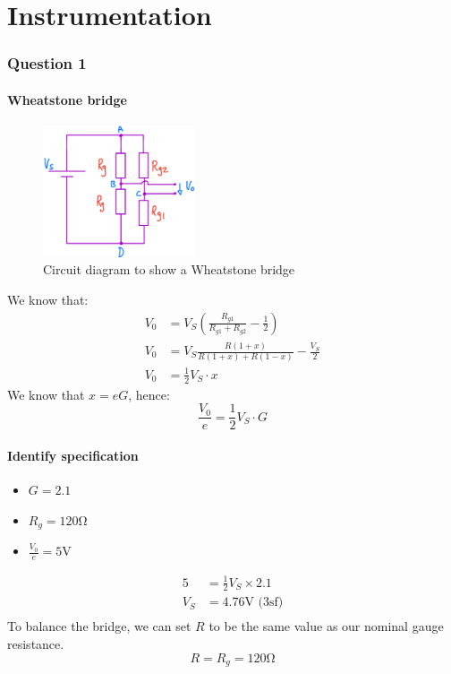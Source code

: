 \documentclass[12pt]{article}
\numberwithin{equation}{section}
\begin{document}
\part{Instrumentation}
\section{Question 1}
\subsection*{Wheatstone bridge}
\begin{figure}[H]
  \centering
  \includegraphics[width=0.4\textwidth]{./img/4-1circuit.png}
  \caption{Circuit diagram to show a Wheatstone bridge}
\end{figure}
We know that:
\begin{align}
  V_0 &= V_S \left( \frac{R_{g1}}{R_{g1} + R_{g2}} - \frac{1}{2} \right)\\
  V_0 &= V_S \frac{R(1+x)}{R(1+x) + R(1-x)} - \frac{V_S}{2}\\
  V_0 &= \frac{1}{2} V_S \cdot x
\end{align}
We know that $x = eG$, hence:
\begin{equation}
  \frac{V_0}{e} = \frac{1}{2}V_S \cdot G
\end{equation}
\subsection*{Identify specification}
\begin{itemize}
  \item $G = 2.1$
  \item $R_g = 120\si{\ohm}$
  \item $\frac{V_0}{e} = 5\si{\volt}$
\end{itemize}
\begin{align}
  5 &= \frac{1}{2} V_S \times 2.1\\
  V_S &= 4.76 \si{\volt} \textrm{ (3sf)}\\
\end{align}
To balance the bridge, we can set $R$ to be the same value as our nominal gauge resistance.
\begin{equation}
  R = R_g = 120\si{\ohm}
\end{equation}
\end{document}
